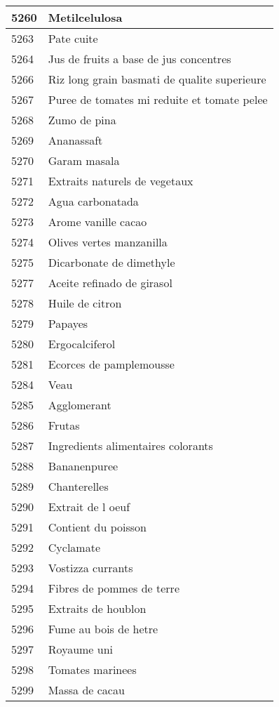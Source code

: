 \begin{longtable}{|l|l|}
5260 & Metilcelulosa \\ \hline 
5263 & Pate cuite \\ \hline 
5264 & Jus de fruits a base de jus concentres \\ \hline 
5266 & Riz long grain basmati de qualite superieure \\ \hline 
5267 & Puree de tomates mi reduite et tomate pelee \\ \hline 
5268 & Zumo de pina \\ \hline 
5269 & Ananassaft \\ \hline 
5270 & Garam masala \\ \hline 
5271 & Extraits naturels de vegetaux \\ \hline 
5272 & Agua carbonatada \\ \hline 
5273 & Arome vanille cacao \\ \hline 
5274 & Olives vertes manzanilla \\ \hline 
5275 & Dicarbonate de dimethyle \\ \hline 
5277 & Aceite refinado de girasol \\ \hline 
5278 & Huile de citron \\ \hline 
5279 & Papayes \\ \hline 
5280 & Ergocalciferol \\ \hline 
5281 & Ecorces de pamplemousse \\ \hline 
5284 & Veau \\ \hline 
5285 & Agglomerant \\ \hline 
5286 & Frutas \\ \hline 
5287 & Ingredients alimentaires colorants \\ \hline 
5288 & Bananenpuree \\ \hline 
5289 & Chanterelles \\ \hline 
5290 & Extrait de l oeuf \\ \hline 
5291 & Contient du poisson \\ \hline 
5292 & Cyclamate \\ \hline 
5293 & Vostizza currants \\ \hline 
5294 & Fibres de pommes de terre \\ \hline 
5295 & Extraits de houblon \\ \hline 
5296 & Fume au bois de hetre \\ \hline 
5297 & Royaume uni \\ \hline 
5298 & Tomates marinees \\ \hline 
5299 & Massa de cacau \\ \hline 

\end{longtable}
